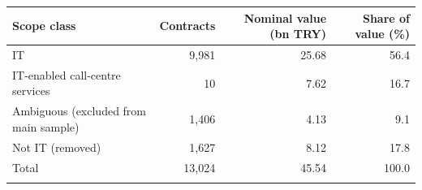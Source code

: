 \begin{tabular}{@{}lrrr@{}}
\toprule
Scope class & Contracts & Nominal value (bn TRY) & Share of value (\%)\\
\midrule
IT & 9,981 & 25.68 & 56.4\\
IT-enabled call-centre services & 10 & 7.62 & 16.7\\
Ambiguous (excluded from main sample) & 1,406 & 4.13 & 9.1\\
Not IT (removed) & 1,627 & 8.12 & 17.8\\
\midrule
Total & 13,024 & 45.54 & 100.0\\
\botrule
\end{tabular}